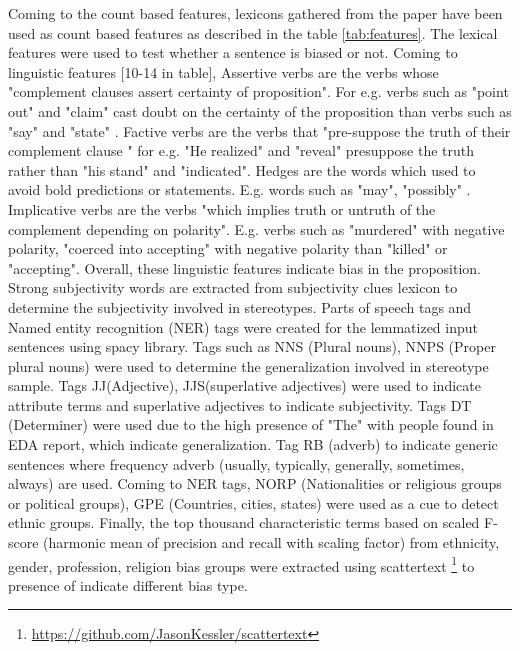 Coming to the count based features, lexicons gathered from the paper  \cite{recasens2013linguistic}  have been used as count based features as described in the table \ref{tab:features}. The lexical features were used to test whether a sentence is biased or not. Coming to linguistic features [10-14 in table], Assertive verbs \cite{hooper1975assertive} are the verbs whose "complement clauses assert certainty of proposition"\cite{recasens2013linguistic}. For e.g. verbs such as "point out" and "claim" cast doubt on the certainty of the proposition than verbs such as "say" and "state" \cite{recasens2013linguistic}. Factive verbs \cite{kiparsky1970progress} are the verbs that "pre-suppose the truth of their complement clause "\cite{recasens2013linguistic} for e.g. "He realized" and "reveal" presuppose the truth rather than  "his stand" and "indicated". Hedges are the words which used to avoid bold predictions or statements. E.g. words such as "may", "possibly" \cite{recasens2013linguistic}. Implicative verbs \cite{karttunen1971implicative} are the verbs "which implies truth or untruth of the complement depending on polarity"\cite{recasens2013linguistic}. E.g. verbs such as "murdered" with negative polarity, "coerced into accepting" with negative polarity than "killed" or "accepting". Overall, these linguistic features indicate bias in the proposition. Strong subjectivity words are extracted from subjectivity clues lexicon \cite{wilson2005recognizing} to determine the subjectivity involved in stereotypes. Parts of speech tags and Named entity recognition (NER) tags were created for the lemmatized input sentences using spacy  library. Tags such as NNS (Plural nouns), NNPS (Proper plural nouns) were used to determine the generalization involved in stereotype sample. Tags JJ(Adjective), JJS(superlative adjectives) were used to indicate attribute terms and superlative adjectives to indicate subjectivity. Tags DT (Determiner) were used due to the high presence of "The" with people found in EDA report, which indicate generalization. Tag RB (adverb) to indicate generic sentences where frequency adverb (usually, typically, generally, sometimes, always) are used. Coming to NER tags, NORP (Nationalities or religious groups or political groups), GPE (Countries, cities, states) were used as a cue to detect ethnic groups. Finally, the top thousand characteristic terms based on scaled F-score (harmonic mean of precision and recall with scaling factor) from ethnicity, gender, profession, religion bias groups were extracted using scattertext \footnote{\url{https://github.com/JasonKessler/scattertext}} to presence of indicate different bias type.

